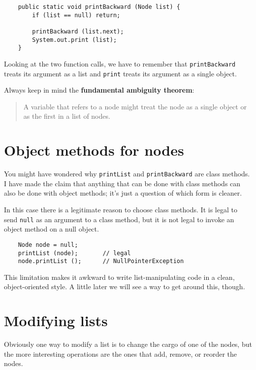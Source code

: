 \begin{verbatim}
    public static void printBackward (Node list) {
        if (list == null) return;

        printBackward (list.next);
        System.out.print (list);
    }    

\end{verbatim}
%
Looking at the two function calls, we have to remember that
{\tt printBackward} treats its argument as a list and {\tt print}
treats its argument as a single object.

Always keep in mind the {\bf fundamental ambiguity theorem}:

\begin{quote}
A variable that refers to a node
might treat the node as a single object or as the first
in a list of nodes.
\end{quote}


\section{Object methods for nodes}

You might have wondered why {\tt printList} and {\tt printBackward}
are class methods.  I have made the claim that anything that can
be done with class methods can also be done with object methods;
it's just a question of which form is cleaner.

In this case there is a legitimate reason to choose
class methods.  It is legal to send {\tt null}
as an argument to a class method, but it is not legal to invoke
an object method on a null object.

\begin{verbatim}
	Node node = null;
	printList (node);       // legal
	node.printList ();      // NullPointerException
\end{verbatim}
%
This limitation makes it awkward to write list-manipulating
code in a clean, object-oriented style.  A little later we
will see a way to get around this, though.


\section{Modifying lists}

Obviously one way to modify a list is to change the cargo of
one of the nodes, but the more interesting operations are the
ones that add, remove, or reorder the nodes.

